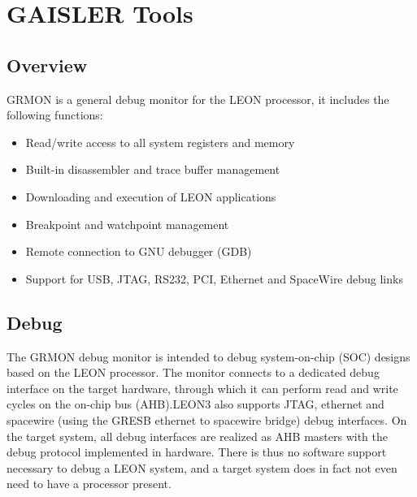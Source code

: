 

\section{GAISLER Tools}
\label{sec:gaisler_tools}
\subsection{Overview}
 GRMON is a general debug monitor for the LEON processor, it includes the following functions:
\begin{itemize}

 \item Read/write access to all system registers and memory
 \item Built-in disassembler and trace buffer management
 \item Downloading and execution of LEON applications
 \item Breakpoint and watchpoint management
 \item Remote connection to GNU debugger (GDB)
 \item Support for USB, JTAG, RS232, PCI, Ethernet and SpaceWire debug links

\end{itemize}

\subsection{Debug}

The GRMON debug monitor is intended to debug system-on-chip (SOC) designs based on the LEON processor. 
The monitor connects to a dedicated debug interface on the target hardware, through which it can perform
read and write cycles on the on-chip bus (AHB).LEON3 also supports JTAG, ethernet and
spacewire (using the GRESB ethernet to spacewire bridge) debug interfaces. On the target system, all debug
interfaces are realized as AHB masters with the debug protocol implemented in hardware. There is thus no
software support necessary to debug a LEON system, and a target system does in fact not even need to have a processor present.

